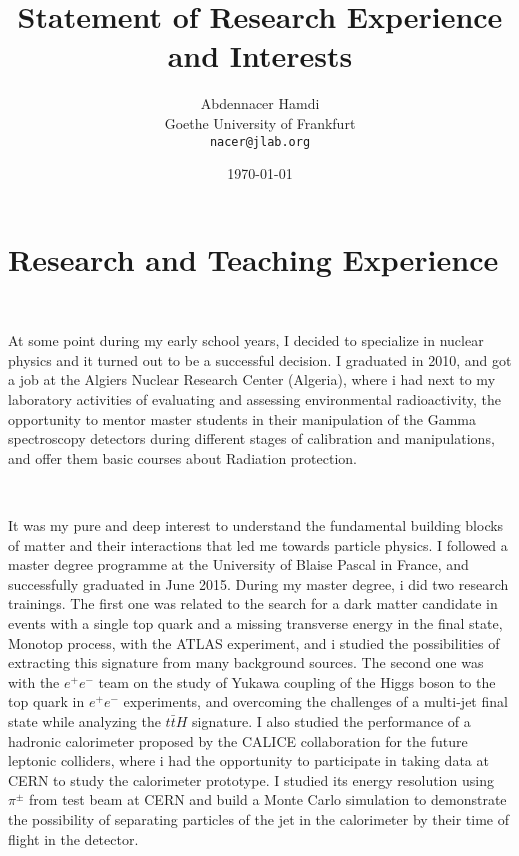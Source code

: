\documentclass[a4paper,roman]{article}
\title{Statement of Research Experience and Interests}
\author{Abdennacer Hamdi\\
Goethe University of Frankfurt\\
\texttt{nacer@jlab.org}}
\date{\today}
\begin{document}
\fontsize{12}{15}
\selectfont
\maketitle

\section*{Research and Teaching Experience}
~\par At some point during my early school years, I decided to specialize in nuclear physics and it turned out to be a successful decision. I graduated in 2010, and got a job at the Algiers Nuclear Research Center (Algeria), where i had next to my laboratory activities of evaluating and assessing environmental radioactivity, the opportunity to mentor master students in their manipulation of the Gamma spectroscopy detectors during different stages of calibration and manipulations, and offer them basic courses about Radiation protection.

~\par It was my pure and deep interest to understand the fundamental building blocks of matter and their interactions that led me towards particle physics. I followed a master degree programme at the University of Blaise Pascal in France, and successfully graduated in June 2015. During my master degree, i did two research trainings. The first one was related to the search for a dark matter candidate in events with a single top quark and a missing transverse energy in the final state, Monotop process, with the ATLAS experiment, and i studied the possibilities of extracting this signature from many background sources. The second one was with the $e^+e^-$ team on the study of Yukawa coupling of the Higgs boson to the top quark in $e^+e^-$ experiments, and overcoming the challenges of a multi-jet final state while analyzing the $t\bar{t}H$ signature. I also studied the performance of a hadronic calorimeter proposed by the CALICE collaboration for the future leptonic colliders, where i had the opportunity to participate in taking data at CERN to study the calorimeter prototype. I studied its energy resolution using $\pi^{\pm}$ from test beam at CERN and build a Monte Carlo simulation to demonstrate the possibility of separating particles of the jet in the calorimeter by their time of flight in the detector.
\end{document}
